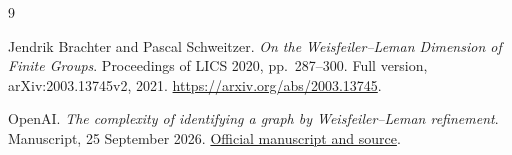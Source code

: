 \documentclass[11pt]{article}
\theoremstyle{definition}
\theoremstyle{remark}
\numberwithin{equation}{section}
\begin{document}
\begingroup
\small
\begin{thebibliography}{9}
\setlength{\itemsep}{3pt}
\setlength{\parskip}{0pt}

Jendrik Brachter and Pascal Schweitzer.
\emph{On the Weisfeiler--Leman Dimension of Finite Groups}.
Proceedings of LICS 2020, pp.\ 287--300. Full version,
arXiv:2003.13745v2, 2021.
\url{https://arxiv.org/abs/2003.13745}.

OpenAI.
\emph{The complexity of identifying a graph by Weisfeiler--Leman refinement}.
Manuscript, 25 September 2026.
\href{https://github.com/openai/math/tree/fd4aeeb2ee4fc729c18d98444fed42fd0529eeeb/preprints/The-complexity-of-identifying-a-graph-by-Weisfeiler-Leman-refinement-September-25-2026}{Official manuscript and source}.

\end{thebibliography}
\endgroup
\end{document}
